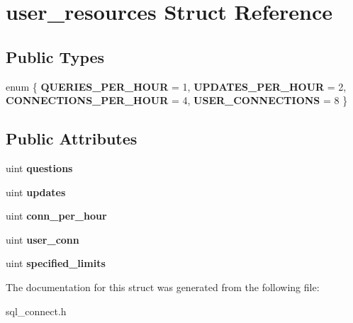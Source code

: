 \hypertarget{structuser__resources}{}\section{user\+\_\+resources Struct Reference}
\label{structuser__resources}
\subsection*{Public Types}
\begin{DoxyCompactItemize}
\item 
\mbox{\label{structuser__resources_a79bb033ccb00d20562940dffc8644dc2}} 
enum \{ {\bfseries Q\+U\+E\+R\+I\+E\+S\+\_\+\+P\+E\+R\+\_\+\+H\+O\+UR} = 1, 
{\bfseries U\+P\+D\+A\+T\+E\+S\+\_\+\+P\+E\+R\+\_\+\+H\+O\+UR} = 2, 
{\bfseries C\+O\+N\+N\+E\+C\+T\+I\+O\+N\+S\+\_\+\+P\+E\+R\+\_\+\+H\+O\+UR} = 4, 
{\bfseries U\+S\+E\+R\+\_\+\+C\+O\+N\+N\+E\+C\+T\+I\+O\+NS} = 8
 \}
\end{DoxyCompactItemize}
\subsection*{Public Attributes}
\begin{DoxyCompactItemize}
\item 
\mbox{\label{structuser__resources_a86cfa948f13fe047de9b7532d8d715df}} 
uint {\bfseries questions}
\item 
\mbox{\label{structuser__resources_a6a638e41c92328b8880ef2469d39dc4b}} 
uint {\bfseries updates}
\item 
\mbox{\label{structuser__resources_a23e1f1aae6687251fe73bcce79b44545}} 
uint {\bfseries conn\+\_\+per\+\_\+hour}
\item 
\mbox{\label{structuser__resources_a285def316b8bb70ccf588ac64776d353}} 
uint {\bfseries user\+\_\+conn}
\item 
\mbox{\label{structuser__resources_a954b316ba05dd4812b9dca4b50ced715}} 
uint {\bfseries specified\+\_\+limits}
\end{DoxyCompactItemize}


The documentation for this struct was generated from the following file\+:\begin{DoxyCompactItemize}
\item 
sql\+\_\+connect.\+h\end{DoxyCompactItemize}
